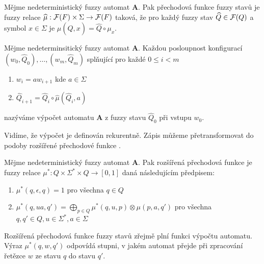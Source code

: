 \begin{definition}\label{def-PreFunFuzzStav}
 Mějme nedeterministický fuzzy automat $\mathbf{A}$. Pak přechodová funkce fuzzy stavů je fuzzy relace $\widehat{\mu}: \mathcal{F}(F) \times \Sigma \rightarrow \mathcal{F}(F)$ taková, že pro každý fuzzy stav $\widehat{Q} \in \mathcal{F}(Q)$ a symbol $x \in \Sigma$ je $\widehat{\mu}(\widehat{Q}, x) = \widehat{Q} \circ \mu_x$.
\end{definition}

\begin{definition}
  Mějme nedeterminsitický fuzzy automat $\mathbf{A}$. Každou posloupnost konfigurací $(w_0, \widehat{Q}_0), \dots, (w_m, \widehat{Q}_m)$ splňující pro každé $0 \leq i < m$
  \begin{enumerate}
   \item $w_{i} = a w_{i+1}$ kde $a \in \Sigma$
   \item $\widehat{Q}_{i+1} = \widehat{Q}_{i} \circ \widehat{\mu}(\widehat{Q}_{i}, a)$
  \end{enumerate}
  nazýváme výpočet automatu $\mathbf{A}$ z fuzzy stavu $\widehat{Q}_0$ při vstupu $w_0$.
\end{definition}

Vidíme, že výpočet je definován rekurentně. Zápis můžeme přetransformovat do podoby rozšířené přechodové funkce \cite{IgnCirBog-DetFuzAutMemValComResLat}.

\begin{definition}\label{def-RozPreFunFuzzStav}
 Mějme nedeterministický fuzzy automat $\mathbf{A}$. Pak rozšířená přechodová funkce je fuzzy relace $\mu^*: Q \times \Sigma^* \times Q \rightarrow [0,1]$ daná následujícím předpisem:
 
 \begin{enumerate}
  \item $\mu^*(q, \epsilon, q) = 1$ pro všechna $q \in Q$
  \item $\mu^*(q, u a, q') =  \bigoplus_{p \in Q} \mu^*(q, u, p) \otimes \mu(p, a, q')$ pro všechna $q, q' \in Q, u \in \Sigma^*, a \in \Sigma$
 \end{enumerate}
\end{definition}

Rozšířená přechodová funkce fuzzy stavů zřejmě plní funkci výpočtu automatu. Výraz $\mu^*(q, w, q')$ odpovídá stupni, v jakém automat přejde při zpracování řetězce $w$ ze stavu $q$ do stavu $q'$. 

